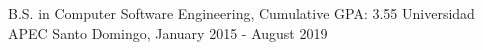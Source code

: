 \begin{cventries}
  \cventry
    {B.S. in Computer Software Engineering, Cumulative GPA: 3.55}
    {Universidad APEC}
    {Santo Domingo, \mycountry}
    {January 2015 - August 2019}
    {
    }
\end{cventries}
